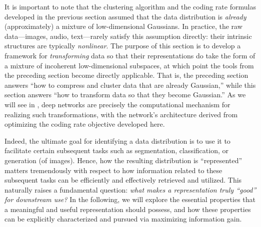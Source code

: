 \documentclass[../../book-main.tex]{subfiles}
\begin{document}
It is important to note that the clustering algorithm and the coding
rate formulas developed in the previous section assumed that the data
distribution is \textit{already} (approximately) a mixture of low-dimensional
Gaussians.
In practice, the raw data---images, audio, text---rarely satisfy this
assumption directly: their intrinsic structures are typically
\textit{nonlinear}. The purpose of this section is to develop a
framework for \textit{transforming} data so that their representations
do take the form of a mixture of incoherent low-dimensional subspaces,
at which point the tools from the preceding section become directly
applicable. That is, the preceding section answers ``how to compress
and cluster data that are already Gaussian,'' while this section
answers ``how to transform data so that they become Gaussian.'' As we
will see in , deep networks are precisely the
computational mechanism for realizing such transformations, with the
network's architecture derived from optimizing the coding rate
objective developed here.

Indeed, the ultimate goal for identifying a data distribution is to use it to
facilitate certain subsequent tasks such as segmentation, classification, or
generation (of images). Hence, how the resulting distribution is ``represented''
matters tremendously with respect to how information related to these
subsequent tasks can be efficiently and effectively retrieved and
utilized. This naturally raises a fundamental question: {\em what
makes a representation truly ``good'' for downstream use?} In the
following, we will explore the essential properties that a meaningful
and useful representation should possess, and how these properties
can be explicitly characterized and pursued via maximizing information gain.
\end{document}
